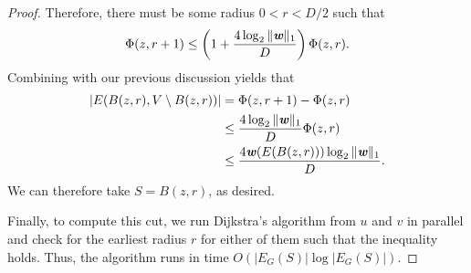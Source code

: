 \begin{proof}
Therefore, there must be some radius $0 < r < D/2$ such that
\begin{align*}
\Phi(z,r+1) \le \left(1+ \frac{4 \log_2 \|\boldsymbol{{\mathit{w}}}\|_1}{D}\right) \Phi(z,r).
\end{align*}
Combining with our previous discussion yields that
\begin{align*}
|E(B(z,r), V \setminus B(z,r))|
&= \Phi(z, r+1) - \Phi(z, r) \\
&\le \frac{4 \log_2 \|\boldsymbol{{\mathit{w}}}\|_1}{D}\Phi(z,r) \\
&\le \frac{4 \boldsymbol{{\mathit{w}}}(E(B(z,r))) \log_2 \|\boldsymbol{{\mathit{w}}}\|_1}{D}.
\end{align*}
We can therefore take $S = B(z,r)$, as desired.

Finally, to compute this cut, we run Dijkstra's algorithm from $u$ and $v$ in parallel and check for the earliest radius $r$ for either of them such that the inequality holds. Thus, the algorithm runs in time $O(|E_G(S)| \log |E_G(S)|)$.
\end{proof}

